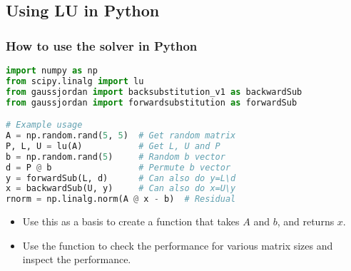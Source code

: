 
\subsection*{Using LU in Python}
\begin{frame}[fragile]
  \frametitle{How to use the solver in Python}
  \begin{lstlisting}[language=Python]
import numpy as np
from scipy.linalg import lu
from gaussjordan import backsubstitution_v1 as backwardSub
from gaussjordan import forwardsubstitution as forwardSub

# Example usage
A = np.random.rand(5, 5)  # Get random matrix
P, L, U = lu(A)           # Get L, U and P
b = np.random.rand(5)     # Random b vector
d = P @ b                 # Permute b vector
y = forwardSub(L, d)      # Can also do y=L\d
x = backwardSub(U, y)     # Can also do x=U\y
rnorm = np.linalg.norm(A @ x - b)  # Residual
  \end{lstlisting}
  \pause
  \begin{itemize}
     \item Use this as a basis to create a function that takes $A$ and $b$, and returns $x$.
     \item Use the function to check the performance for various matrix sizes and inspect the performance.
  \end{itemize}

\end{frame}
